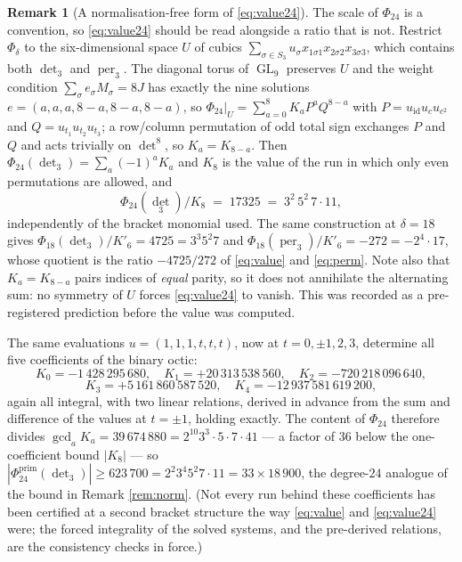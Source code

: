 \documentclass[11pt,reqno]{amsart}
\theoremstyle{plain}
\theoremstyle{definition}
\newtheorem{remark}[theorem]{Remark}
\DeclareMathOperator{\GL}{GL}
\DeclareMathOperator{\per}{per}
\begin{document}
\begin{remark}[A normalisation-free form of \eqref{eq:value24}]\label{rem:norm24}
The scale of $\Phi_{24}$ is a convention, so \eqref{eq:value24} should be read
alongside a ratio that is not.  Restrict $\Phi_\delta$ to the six-dimensional
space $U$ of cubics $\sum_{\sigma\in S_3}u_\sigma
x_{1\sigma1}x_{2\sigma2}x_{3\sigma3}$, which contains both $\det_3$ and
$\per_3$.  The diagonal torus of $\GL_9$ preserves $U$ and the weight condition
$\sum_\sigma e_\sigma M_\sigma=8J$ has exactly the nine solutions
$e=(a,a,a,8-a,8-a,8-a)$, so
$\Phi_{24}|_U=\sum_{a=0}^{8}K_aP^{a}Q^{8-a}$ with $P=u_{\mathrm{id}}u_cu_{c^2}$
and $Q=u_{t_1}u_{t_2}u_{t_3}$; a row/column permutation of odd total sign
exchanges $P$ and $Q$ and acts trivially on $\det^{8}$, so $K_a=K_{8-a}$.  Then
$\Phi_{24}(\det_3)=\sum_a(-1)^aK_a$ and $K_8$ is the value of the run in which
only even permutations are allowed, and
\[
  \Phi_{24}(\det_3)/K_8\;=\;17325\;=\;3^{2}\,5^{2}\,7\cdot11 ,
\]
independently of the bracket monomial used.  The same construction at
$\delta=18$ gives $\Phi_{18}(\det_3)/K'_6=4725=3^{3}5^{2}7$ and
$\Phi_{18}(\per_3)/K'_6=-272=-2^{4}\cdot17$, whose quotient is the ratio
$-4725/272$ of \eqref{eq:value} and \eqref{eq:perm}.  Note also that
$K_a=K_{8-a}$ pairs indices of \emph{equal} parity, so it does not annihilate
the alternating sum: no symmetry of $U$ forces \eqref{eq:value24} to vanish.
This was recorded as a pre-registered prediction before the value was computed.

The same evaluations $u=(1,1,1,t,t,t)$, now at $t=0,\pm1,2,3$, determine all
five coefficients of the binary octic:
\[
  K_0=-1\,428\,295\,680,\quad K_1=+20\,313\,538\,560,\quad
  K_2=-720\,218\,096\,640,
\]
\[
  K_3=+5\,161\,860\,587\,520,\quad K_4=-12\,937\,581\,619\,200,
\]
again all integral, with two linear relations, derived in advance from the sum
and difference of the values at $t=\pm1$, holding exactly.  The content of $\Phi_{24}$ therefore divides
$\gcd_aK_a=39\,674\,880=2^{10}3^{3}\cdot5\cdot7\cdot41$ --- a factor of $36$
below the one-coefficient bound $|K_8|$ --- so
$|\Phi_{24}^{\mathrm{prim}}(\det_3)|\ge623\,700=2^{2}3^{4}5^{2}7\cdot11
=33\times18\,900$, the degree-$24$ analogue of the bound in Remark
\ref{rem:norm}.  (Not every run behind these coefficients has been certified at
a second bracket structure the way \eqref{eq:value} and \eqref{eq:value24}
were; the forced integrality of the solved systems, and the pre-derived
relations, are the consistency checks in force.)
\end{remark}
\end{document}
